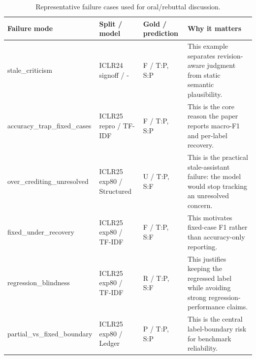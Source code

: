 \begin{table}[t]
\centering
\scriptsize
\setlength{\tabcolsep}{3pt}
\begin{tabular}{p{}p{}p{}p{}}
\toprule
Failure mode & Split / model & Gold / prediction & Why it matters \\
\midrule
stale\_criticism & ICLR24 signoff / - & F / T:P, S:P & This example separates revision-aware judgment from static semantic plausibility. \\
accuracy\_trap\_fixed\_cases & ICLR25 repro / TF-IDF & F / T:P, S:P & This is the core reason the paper reports macro-F1 and per-label recovery. \\
over\_crediting\_unresolved & ICLR25 exp80 / Structured & U / T:P, S:F & This is the practical stale-assistant failure: the model would stop tracking an unresolved concern. \\
fixed\_under\_recovery & ICLR25 exp80 / TF-IDF & F / T:P, S:F & This motivates fixed-case F1 rather than accuracy-only reporting. \\
regression\_blindness & ICLR25 exp80 / TF-IDF & R / T:P, S:F & This justifies keeping the regressed label while avoiding strong regression-performance claims. \\
partial\_vs\_fixed\_boundary & ICLR25 exp80 / Ledger & P / T:P, S:P & This is the central label-boundary risk for benchmark reliability. \\
\bottomrule
\end{tabular}
\caption{Representative failure cases used for oral/rebuttal discussion.}
\label{tab:oral-casebook-summary}
\end{table}
